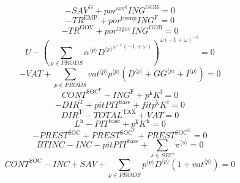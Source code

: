 \begin{equation}
-{S\!A\!V}^{\mathrm{G}} + {{p\!o\!r}^{\mathrm{sav}^{\mathrm{g}}}} {{I\!N\!G}^{\mathrm{GOB}}} = 0
\end{equation}
\begin{equation}
-{T\!R}^{\mathrm{EMP}} + {{p\!o\!r}^{\mathrm{tremp}}} {{I\!N\!G}^{\mathrm{F}}} = 0
\end{equation}
\begin{equation}
-{T\!R}^{\mathrm{GOV}} + {{p\!o\!r}^{\mathrm{trgov}}} {{I\!N\!G}^{\mathrm{GOB}}} = 0
\end{equation}
\begin{equation}
U - \left(\sum_{p\in {P\!R\!O\!D\!S}} {{\alpha}^{\langle p\rangle}} {{{D}^{\langle p\rangle}}^{{\omega}^{-1} \left(-1 + \omega\right)}}\right)^{{\omega} \left(-1 + \omega\right)^{-1}} = 0
\end{equation}
\begin{equation}
-{V\!A\!T} + \sum_{p\in {P\!R\!O\!D\!S}} {{{v\!a\!t}}^{\langle p\rangle}} {{p}^{\langle p\rangle}} \left({D}^{\langle p\rangle} + {{G\!G}}^{\langle p\rangle} + {I}^{\langle p\rangle}\right) = 0
\end{equation}
\begin{equation}
{C\!O\!N\!T}^{\mathrm{SOC}^{\mathrm{F}}} - {I\!N\!G}^{\mathrm{F}} + {p^{\mathrm{k}}} {K^{\mathrm{f}}} = 0
\end{equation}
\begin{equation}
-{D\!I\!R}^{\mathrm{T}} + {{p\!i\!t}} {{P\!I\!T}^{\mathrm{base}}} + {{f\!i\!t}} {p^{\mathrm{k}}} {K^{\mathrm{f}}} = 0
\end{equation}
\begin{equation}
{D\!I\!R}^{\mathrm{T}} - {T\!O\!T\!A\!L}^{\mathrm{TAX}} + {V\!A\!T} = 0
\end{equation}
\begin{equation}
L^{\mathrm{h}} - {P\!I\!T}^{\mathrm{base}} + {p^{\mathrm{k}}} {K^{\mathrm{h}}} = 0
\end{equation}
\begin{equation}
-{P\!R\!E\!S\!T}^{\mathrm{SOC}} + {P\!R\!E\!S\!T}^{\mathrm{SOC}^{\mathrm{F}}} + {P\!R\!E\!S\!T}^{\mathrm{SOC}^{\mathrm{G}}} = 0
\end{equation}
\begin{equation}
{B\!T\!I\!N\!C} - {I\!N\!C} - {{p\!i\!t}} {{P\!I\!T}^{\mathrm{base}}} + \sum_{s\in {S\!E\!C}} {\pi}^{\langle s\rangle} = 0
\end{equation}
\begin{equation}
{C\!O\!N\!T}^{\mathrm{SOC}} - {I\!N\!C} + {S\!A\!V} + \sum_{p\in {P\!R\!O\!D\!S}} {{p}^{\langle p\rangle}} {{D}^{\langle p\rangle}} \left(1 + {{v\!a\!t}}^{\langle p\rangle}\right) = 0
\end{equation}
